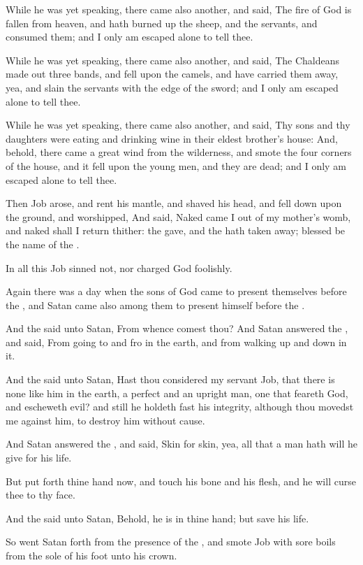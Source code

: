 \Verse While he was yet speaking, there came also another, and said, The fire of God is fallen from heaven, and hath burned up the sheep, and the servants, and consumed them; and I only am escaped alone to tell thee.

\Verse While he was yet speaking, there came also another, and said, The Chaldeans made out three bands, and fell upon the camels, and have carried them away, yea, and slain the servants with the edge of the sword; and I only am escaped alone to tell thee.

\Verse While he was yet speaking, there came also another, and said, Thy sons and thy daughters were eating and drinking wine in their eldest brother's house: \Verse And, behold, there came a great wind from the wilderness, and smote the four corners of the house, and it fell upon the young men, and they are dead; and I only am escaped alone to tell thee.

\Verse Then Job arose, and rent his mantle, and shaved his head, and fell down upon the ground, and worshipped, \Verse And said, Naked came I out of my mother's womb, and naked shall I return thither: the \LORD gave, and the \LORD hath taken away; blessed be the name of the \LORD.

\Verse In all this Job sinned not, nor charged God foolishly.


\Chapter
\Verse Again there was a day when the sons of God came to present themselves before the \LORD, and Satan came also among them to present himself before the \LORD.

\Verse And the \LORD said unto Satan, From whence comest thou? And Satan answered the \LORD, and said, From going to and fro in the earth, and from walking up and down in it.

\Verse And the \LORD said unto Satan, Hast thou considered my servant Job, that there is none like him in the earth, a perfect and an upright man, one that feareth God, and escheweth evil? and still he holdeth fast his integrity, although thou movedst me against him, to destroy him without cause.

\Verse And Satan answered the \LORD, and said, Skin for skin, yea, all that a man hath will he give for his life.

\Verse But put forth thine hand now, and touch his bone and his flesh, and he will curse thee to thy face.

\Verse And the \LORD said unto Satan, Behold, he is in thine hand; but save his life.

\Verse So went Satan forth from the presence of the \LORD, and smote Job with sore boils from the sole of his foot unto his crown.

